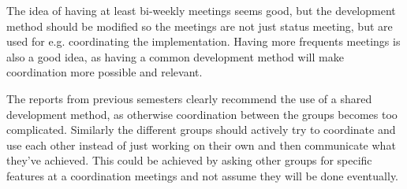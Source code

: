 The idea of having at least bi-weekly meetings seems good, but the development method should be modified so the meetings are not just status meeting, but are used for e.g. coordinating the implementation.
Having more frequents meetings is also a good idea, as having a common development method will make coordination more possible and relevant.

The reports from previous semesters clearly recommend the use of a shared development method, as otherwise coordination between the groups becomes too complicated. Similarly the different groups should actively try to coordinate and use each other instead of just working on their own and then communicate what they've achieved. 
This could be achieved by asking other groups for specific features at a coordination meetings and not assume they will be done eventually.





